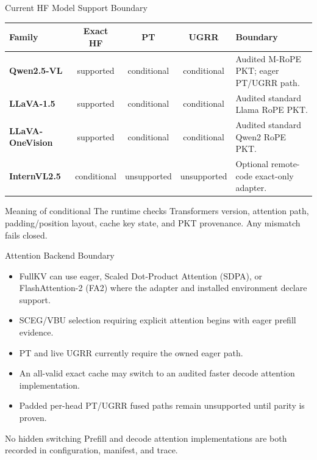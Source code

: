 \documentclass[aspectratio=169,10pt]{beamer}
\newcommand{\tightitems}{\setlength{\itemsep}{0.28em}\setlength{\parskip}{0pt}}
\begin{document}
\begin{frame}{Current HF Model Support Boundary}
\scriptsize
\begin{tabularx}{\textwidth}{>{\bfseries}p{}c c c X}
\toprule
Family & Exact HF & PT & UGRR & Boundary \\
\midrule
Qwen2.5-VL & supported & conditional & conditional & Audited M-RoPE PKT; eager PT/UGRR path. \\
LLaVA-1.5 & supported & conditional & conditional & Audited standard Llama RoPE PKT. \\
LLaVA-OneVision & supported & conditional & conditional & Audited standard Qwen2 RoPE PKT. \\
InternVL2.5 & conditional & unsupported & unsupported & Optional remote-code exact-only adapter. \\
\bottomrule
\end{tabularx}
\begin{alertblock}{Meaning of conditional}
The runtime checks Transformers version, attention path, padding/position layout, cache key state,
and PKT provenance. Any mismatch fails closed.
\end{alertblock}
\end{frame}

\begin{frame}{Attention Backend Boundary}
\small
\begin{itemize}\tightitems
  \item FullKV can use eager, Scaled Dot-Product Attention (SDPA), or FlashAttention-2 (FA2) where
        the adapter and installed environment declare support.
  \item SCEG/VBU selection requiring explicit attention begins with eager prefill evidence.
  \item PT and live UGRR currently require the owned eager path.
  \item An all-valid exact cache may switch to an audited faster decode attention implementation.
  \item Padded per-head PT/UGRR fused paths remain unsupported until parity is proven.
\end{itemize}
\begin{alertblock}{No hidden switching}
Prefill and decode attention implementations are both recorded in configuration, manifest, and
trace.
\end{alertblock}
\end{frame}
\end{document}
